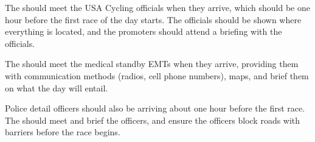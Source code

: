 The  should meet the USA Cycling officials when they arrive,
which should be one hour before the first race of the day starts.
The officials should be shown where everything is located, and the promoters should attend a briefing with the officials.

The  should meet the medical standby EMTs when they arrive,
providing them with communication methods (radios, cell phone numbers), maps, and brief them on what the day will entail.

Police detail officers should also be arriving about one hour before the first race.
The  should meet and brief the officers, and ensure the officers block roads with barriers
before the race begins.
